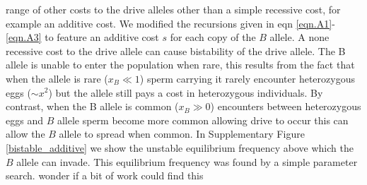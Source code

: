 \documentclass[12pt,letterpaper]{article}
\newcommand{\gc}[1]{{ \color{red} #1}}
\begin{document}
 range of other costs to the drive alleles other than a
simple recessive cost, for example an additive cost. We modified the recursions given in eqn
\ref{eqn.A1}-\ref{eqn.A3} to feature an additive cost $s$ for each
copy of the $B$ allele. A none recessive cost to the drive allele can
cause bistability of the drive allele. The B allele is unable to enter
the population when rare, this results from the fact that
when the allele is rare ($x_B \ll 1$) sperm carrying it rarely
encounter heterozygous eggs ($\sim x^2$) but the allele still pays a
cost in heterozygous individuals.  By contrast, when the B allele is common ($x_B
\gg 0$) encounters between heterozygous eggs and $B$ allele sperm
become more common allowing drive to occur this can allow the $B$
allele to spread when common. In Supplementary Figure
\ref{bistable_additive} we show the unstable equilibrium frequency
above which the $B$ allele can invade. This equilibrium frequency was found by a simple
parameter search.  \gc{wonder if a bit of work could find this}
\end{document}
